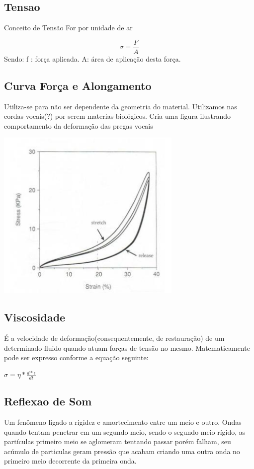 	\subsection{Tensao}
		Conceito de Tensão For por unidade de ar
		
		\[
		\sigma = \frac{F}{A}
		\]
		Sendo:
		f : força aplicada. \linebreak
		A: área de aplicação desta força.
		
	\subsection{Curva Força e Alongamento}
		Utiliza-se para não ser dependente da geometria do material. Utilizamos nas cordas vocais(?) por serem materias biológicos. Cria uma figura ilustrando comportamento da deformação das pregas vocais
		
		\includegraphics{figura1.png}
		
	\subsection{Viscosidade}
		É a velocidade de deformação(consequentemente, de restauração) de
		um determinado fluido quando atuam forças de tensão no mesmo. Matematicamente
		pode ser expresso conforme a equação seguinte: 
		
		$
		\sigma = \eta * \frac{d*\epsilon}{dt}
		$
	
	\subsection{Reflexao de Som}
	
		Um fenômeno ligado a rigidez e amortecimento entre um meio e outro.\cite{MTAGENTE}
		Ondas quando tentam penetrar em um segundo meio, sendo o segundo meio rígido, as partículas primeiro meio se aglomeram tentando passar porém
		falham, seu acúmulo de particulas geram pressão que acabam criando uma outra onda no primeiro meio decorrente da primeira onda.\cite{HenryGray}
		
